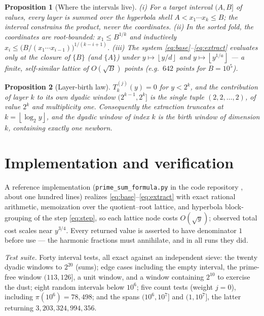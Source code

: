 \documentclass[11pt]{article}
\newtheorem{proposition}{Proposition}
\theoremstyle{remark}
\newcommand{\fl}[1]{\left\lfloor #1 \right\rfloor}
\begin{document}
\begin{proposition}[Where the intervals live]\label{prop:intervals}
(i) For a target interval $(A, B]$ of values, every layer is summed over the hyperbola shell
$A < x_1 \cdots x_k \le B$; the interval constrains the product, never the coordinates. (ii) In the
sorted fold, the coordinates are root-bounded: $x_1 \le B^{1/k}$ and inductively
$x_i \le \big(B/(x_1 \cdots x_{i-1})\big)^{1/(k-i+1)}$. (iii) The system
\eqref{eq:base}--\eqref{eq:extract} evaluates only at the closure of $\{B\}$ (and $\{A\}$) under
$y \mapsto \fl{y/d}$ and $y \mapsto \fl{y^{1/a}}$ --- a finite, self-similar lattice of
$O(\sqrt B)$ points (e.g.\ $642$ points for $B = 10^5$).
\end{proposition}

\begin{proposition}[Layer-birth law]\label{prop:birth}
$T_k^{(j)}(y) = 0$ for $y < 2^k$, and the contribution of layer $k$ to its own dyadic window
$(2^{k-1}, 2^k]$ is the single tuple $(2, 2, \dots, 2)$, of value $2^k$ and multiplicity one.
Consequently the extraction truncates at $k = \fl{\log_2 y}$, and the dyadic window of index $k$ is the
birth window of dimension $k$, containing exactly one newborn.
\end{proposition}

\section{Implementation and verification}

A reference implementation (\texttt{prime\_sum\_formula.py} in the code repository \cite{Code}, about
one hundred lines)
realizes \eqref{eq:base}--\eqref{eq:extract} with exact rational arithmetic, memoization over the
quotient--root lattice, and hyperbola block-grouping of the step \eqref{eq:step}, so each lattice node
costs $O(\sqrt y)$; observed total cost scales near $y^{3/4}$. Every returned value is asserted to have
denominator $1$ before use --- the harmonic fractions must annihilate, and in all runs they did.

\emph{Test suite.} Forty interval tests, all exact against an independent sieve: the twenty dyadic
windows to $2^{20}$ (sums); edge cases including the empty interval, the prime-free window
$(113, 126]$, a unit window, and a window containing $2^{10}$ to exercise the dust; eight random
intervals below $10^6$; five count tests (weight $j = 0$), including $\pi(10^6) = 78{,}498$; and the
spans $(10^6, 10^7]$ and $(1, 10^7]$, the latter returning $3{,}203{,}324{,}994{,}356$.
\end{document}
